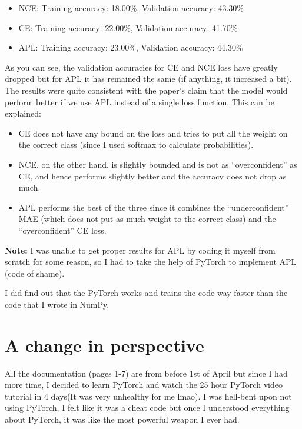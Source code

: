 \documentclass{article}
\begin{document}
\begin{itemize}
    \item NCE: Training accuracy: 18.00\%, Validation accuracy: 43.30\%
    \item CE: Training accuracy: 22.00\%, Validation accuracy: 41.70\%
    \item APL: Training accuracy: 23.00\%, Validation accuracy: 44.30\%
\end{itemize}

As you can see, the validation accuracies for CE and NCE loss have greatly dropped but for APL it has remained the same (if anything, it increased a bit). The results were quite consistent with the paper’s claim that the model would perform better if we use APL instead of a single loss function. This can be explained:
\begin{itemize}
    \item CE does not have any bound on the loss and tries to put all the weight on the correct class (since I used softmax to calculate probabilities).
    \item NCE, on the other hand, is slightly bounded and is not as “overconfident” as CE, and hence performs slightly better and the accuracy does not drop as much.
    \item APL performs the best of the three since it combines the “underconfident” MAE (which does not put as much weight to the correct class) and the “overconfident” CE loss.
\end{itemize}

\textbf{Note:} I was unable to get proper results for APL by coding it myself from scratch for some reason, so I had to take the help of PyTorch to implement APL (code of shame).

\begin{itemsize}
    \item I did find out that the PyTorch works and trains the code way faster than the code that I wrote in NumPy.
\end{itemsize}

\clearpage

\section*{A change in perspective}

All the documentation (pages 1-7) are from before 1st of April but since I had more time, I decided to learn PyTorch and watch the 25 hour PyTorch video tutorial in 4 days(It was very unhealthy for me lmao). I was hell-bent upon not using PyTorch, I felt like it was a cheat code but once I understood everything about PyTorch, it was like the most powerful weapon I ever had.
\end{document}
